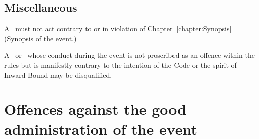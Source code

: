 \documentclass[12pt]{report}
\begin{document}
  \section{Miscellaneous}
  \begin{fenumerate}
    \item A \team\ must not act contrary to or in violation of Chapter~\ref{chapter:Synopsis} (Synopsis of the event.)

    \item A  \team\ or \squad\  whose conduct during the event is not proscribed as an offence within the rules but is manifestly contrary to the intention of the Code or the spirit of Inward Bound may be disqualified.
  \end{fenumerate}
\chapter{Offences against  the good administration of the event}
\end{document}
